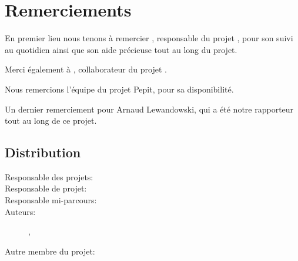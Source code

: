 \documentclass[french]{report}
\begin{document}


\pagestyle{fancyplain}
\renewcommand{\chaptermark}[1]{\markboth{\chaptername\ \thechapter. #1}{}}
\renewcommand{\sectionmark}[1]{\markright{\thesection. #1}}
\lhead[]{\fancyplain{}{\bfseries\leftmark}}
\rhead[]{\fancyplain{}{\bfseries\thepage}}
\cfoot{}
% 
%
\chapter*{Remerciements}
En premier lieu nous tenons à remercier \civiliteResponsableProet{} \responsableProjet{}, responsable du projet \pepitMobil, pour son suivi au quotidien ainsi que son aide précieuse tout au long du projet.

Merci également à \etudiantSL, collaborateur du projet \pepitMobil.

Nous remercions l'équipe du projet Pepit, pour sa disponibilité.

Un dernier remerciement pour Arnaud Lewandowski, qui a été notre rapporteur tout au long de ce projet.


\section*{Distribution}
\begin{description}
\item [Responsable des projets:] \responsableDesProjets
\item [Responsable de projet:] \responsableProjet
\item [Responsable mi-parcours:] \responsableMiParcours
\item [Auteurs:] \etudiantJP, \etudiantRD
\item [Autre membre du projet:] \etudiantSL
\end{description}


\tableofcontents


\end{document}
